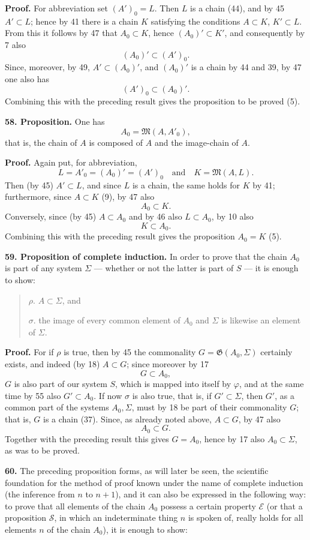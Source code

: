 \documentclass[11pt]{article}
\newcommand{\Mf}{\mathfrak{M}}
\newcommand{\Gf}{\mathfrak{G}}
\newcommand{\partof}{\mathrel{\subset}}
\begin{document}
\textbf{Proof.} For abbreviation set $(A')_0=L$. Then $L$ is a chain (44), and by 45 $A'\partof L$; hence by 41 there is a chain $K$ satisfying the conditions $A\partof K$, $K'\partof L$. From this it follows by 47 that $A_0\partof K$, hence $(A_0)'\partof K'$, and consequently by 7 also
\[
(A_0)'\partof(A')_0.
\]
Since, moreover, by 49, $A'\partof(A_0)'$, and $(A_0)'$ is a chain by 44 and 39, by 47 one also has
\[
(A')_0\partof(A_0)'.
\]
Combining this with the preceding result gives the proposition to be proved (5).

\noindent\textbf{58. Proposition.} One has
\[
A_0=\Mf(A,A'_0),
\]
that is, the chain of $A$ is composed of $A$ and the image-chain of $A$.

\textbf{Proof.} Again put, for abbreviation,
\[
L=A'_0=(A_0)'=(A')_0 \quad\text{and}\quad K=\Mf(A,L).
\]
Then (by 45) $A'\partof L$, and since $L$ is a chain, the same holds for $K$ by 41; furthermore, since $A\partof K$ (9), by 47 also
\[
A_0\partof K.
\]
Conversely, since (by 45) $A\partof A_0$ and by 46 also $L\partof A_0$, by 10 also
\[
K\partof A_0.
\]
Combining this with the preceding result gives the proposition $A_0=K$ (5).

\noindent\textbf{59. Proposition of complete induction.} In order to prove that the chain $A_0$ is part of any system $\Sigma$ — whether or not the latter is part of $S$ — it is enough to show:

\begin{quote}
\(\rho.\) \(A\partof\Sigma\), and

\(\sigma.\) the image of every common element of \(A_0\) and \(\Sigma\) is likewise an element of \(\Sigma\).
\end{quote}

\textbf{Proof.} For if $\rho$ is true, then by 45 the commonality $G=\Gf(A_0,\Sigma)$ certainly exists, and indeed (by 18) $A\partof G$; since moreover by 17
\[
G\partof A_0,
\]
$G$ is also part of our system $S$, which is mapped into itself by $\varphi$, and at the same time by 55 also $G'\partof A_0$. If now $\sigma$ is also true, that is, if $G'\partof\Sigma$, then $G'$, as a common part of the systems $A_0,\Sigma$, must by 18 be part of their commonality $G$; that is, $G$ is a chain (37). Since, as already noted above, $A\partof G$, by 47 also
\[
A_0\partof G.
\]
Together with the preceding result this gives $G=A_0$, hence by 17 also $A_0\partof\Sigma$, as was to be proved.

\noindent\textbf{60.} The preceding proposition forms, as will later be seen, the scientific foundation for the method of proof known under the name of complete induction (the inference from $n$ to $n+1$), and it can also be expressed in the following way: to prove that all elements of the chain $A_0$ possess a certain property $\mathcal E$ (or that a proposition $\mathcal S$, in which an indeterminate thing $n$ is spoken of, really holds for all elements $n$ of the chain $A_0$), it is enough to show:
\end{document}
